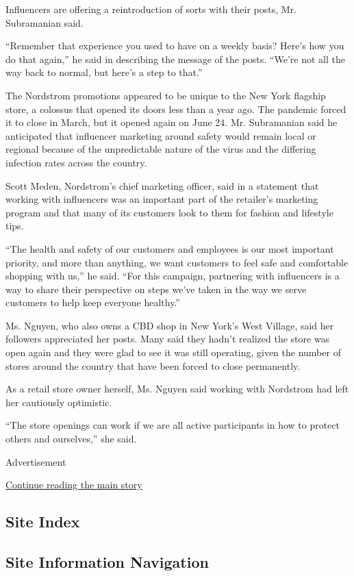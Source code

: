 Influencers are offering a reintroduction of sorts with their posts, Mr.
Subramanian said.

``Remember that experience you used to have on a weekly basis? Here's
how you do that again,'' he said in describing the message of the posts.
``We're not all the way back to normal, but here's a step to that.''

The Nordstrom promotions appeared to be unique to the New York flagship
store, a colossus that opened its doors less than a year ago. The
pandemic forced it to close in March, but it opened again on June 24.
Mr. Subramanian said he anticipated that influencer marketing around
safety would remain local or regional because of the unpredictable
nature of the virus and the differing infection rates across the
country.

Scott Meden, Nordstrom's chief marketing officer, said in a statement
that working with influencers was an important part of the retailer's
marketing program and that many of its customers look to them for
fashion and lifestyle tips.

``The health and safety of our customers and employees is our most
important priority, and more than anything, we want customers to feel
safe and comfortable shopping with us,'' he said. ``For this campaign,
partnering with influencers is a way to share their perspective on steps
we've taken in the way we serve customers to help keep everyone
healthy.''

Ms. Nguyen, who also owns a CBD shop in New York's West Village, said
her followers appreciated her posts. Many said they hadn't realized the
store was open again and they were glad to see it was still operating,
given the number of stores around the country that have been forced to
close permanently.

As a retail store owner herself, Ms. Nguyen said working with Nordstrom
had left her cautiously optimistic.

``The store openings can work if we are all active participants in how
to protect others and ourselves,'' she said.

Advertisement

\protect\hyperlink{after-bottom}{Continue reading the main story}

\hypertarget{site-index}{%
\subsection{Site Index}\label{site-index}}

\hypertarget{site-information-navigation}{%
\subsection{Site Information
Navigation}\label{site-information-navigation}}


